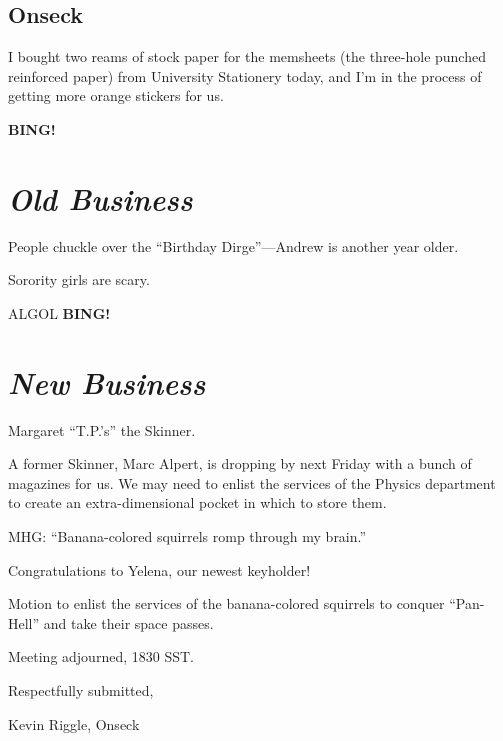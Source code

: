 \documentclass[10pt]{article}
\newcommand{\bing}{{\bf BING!} }
\newcommand{\goto}[1]{\bing \vskip 12pt \section*{{\em{#1}}}}
\begin{document}

\subsection*{Onseck}
I bought two reams of stock paper for the memsheets (the three-hole punched reinforced paper) from
University Stationery today, and I'm in the process of getting more orange stickers for us.


\goto{Old Business}

People chuckle over the ``Birthday Dirge''---Andrew is another year older.

Sorority girls are scary.

ALGOL
\goto{New Business}

Margaret ``T.P.'s'' the Skinner.

A former Skinner, Marc Alpert, is dropping by next Friday with a bunch of magazines for us.
We may need to enlist the services of the Physics department to create an extra-dimensional 
pocket in which to store them.

MHG: ``Banana-colored squirrels romp through my brain.''

Congratulations to Yelena, our newest keyholder!

Motion to enlist the services of the banana-colored squirrels to conquer ``Pan-Hell'' and take
their space passes.

\vspace{12pt}

\noindent
Meeting adjourned, 1830 SST.

\vspace{18pt}

\centerline{Respectfully submitted,}
\centerline{Kevin Riggle, Onseck}
\end{document}
